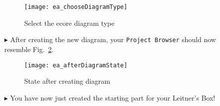 \begin{itemize}
\begin{figure}[htbp]
	\centering
  \texttt{[image: ea\_chooseDiagramType]}
	\caption{Select the ecore diagram type}
	\label{fig:diagram_type}
\end{figure}
\FloatBarrier

 
\item[$\blacktriangleright$] After creating the new diagram, your  \texttt{Project Browser} should now resemble Fig.~\ref{fig:diagram_completed}.

\begin{figure}[htbp]
	\centering
  \texttt{[image: ea\_afterDiagramState]}
	\caption{State after creating diagram}
	\label{fig:diagram_completed}
\end{figure}
\FloatBarrier

\item[$\blacktriangleright$] You have now just created the starting part for your Leitner's Box!

\end{itemize}
